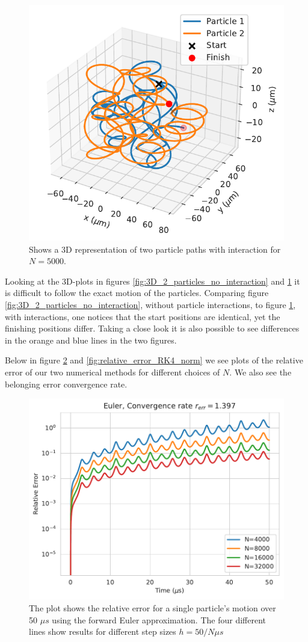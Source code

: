 \documentclass[english,notitlepage,reprint,nofootinbib]{revtex4-1}  %
\begin{document}
\begin{figure}[H]
    \centering
    \includegraphics[width=.5\textwidth]{../figures/3D_2_particles_RK4_interaction_N5000.pdf}
    \caption{Shows a 3D representation of two particle paths with interaction for $N = 5000$.}
    \label{fig:3D_2_particles_with_interaction}
\end{figure}
Looking at the 3D-plots in figures \ref{fig:3D_2_particles_no_interaction} and \ref{fig:3D_2_particles_with_interaction}
it is difficult to follow the exact motion of the particles. Comparing figure \ref{fig:3D_2_particles_no_interaction}, without
particle interactions, to figure \ref{fig:3D_2_particles_with_interaction}, with interactions, one notices that the start positions
are identical, yet the finishing positions differ. Taking a close look it is also possible to see differences in the orange and blue
lines in the two figures.

Below in figure \ref{fig:relative_error_Euler_norm} and \ref{fig:relative_error_RK4_norm} we see plots of the relative error of our two numerical methods for different choices of $N$. We also see the belonging error convergence rate.
\begin{figure}[H]
    \centering
    \includegraphics[width=.5\textwidth]{../figures/relative_error_Euler_norm.pdf}
    \caption{The plot shows the relative error for a single particle's motion over 50 $\mu s$ using the forward Euler approximation.
        The four different lines show results for different step sizes $h = 50/N \mu s$ }
    \label{fig:relative_error_Euler_norm}
\end{figure}
\end{document}
